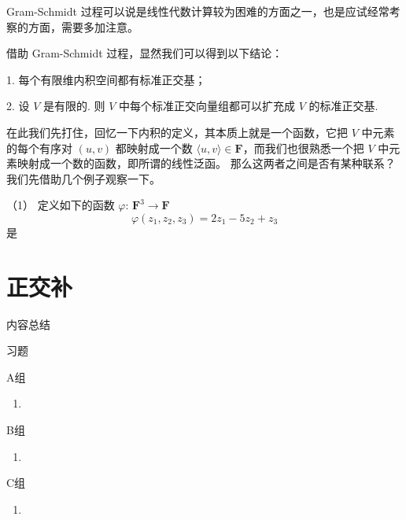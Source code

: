 Gram-Schmidt 过程可以说是线性代数计算较为困难的方面之一，也是应试经常考察的方面，需要多加注意。

借助 Gram-Schmidt 过程，显然我们可以得到以下结论：

1. 每个有限维内积空间都有标准正交基；

2. 设 $ V $ 是有限的. 则 $ V $ 中每个标准正交向量组都可以扩充成 $ V $ 的标准正交基.

\vspace{2ex}

在此我们先打住，回忆一下内积的定义，其本质上就是一个函数，它把 $ V $ 中元素的每个有序对 $(u, v)$ 都映射成一个数 
$ \langle u, v \rangle \in \mathbf{F}$，而我们也很熟悉一个把 $ V $ 中元素映射成一个数的函数，即所谓的线性泛函。
那么这两者之间是否有某种联系？我们先借助几个例子观察一下。

\begin{example}
    \textup{（1）} 定义如下的函数 $\varphi$: $\mathbf{F}^{3} \rightarrow \mathbf{F}$
    \[\varphi(z_1, z_2, z_3) = 2z_1 - 5z_2 + z_3\]
    是
\end{example}

\section{正交补}

\vspace{2ex} 
\centerline{\heiti \Large 内容总结}

\vspace{2ex} 

\centerline{\heiti \Large 习题}
\vspace{2ex} 
{\kaishu }
\begin{flushright}
    \kaishu

\end{flushright}
\centerline{\heiti A组}
\begin{enumerate}
	\item 
\end{enumerate}
\centerline{\heiti B组}
\begin{enumerate}
	\item 
\end{enumerate}
\centerline{\heiti C组}
\begin{enumerate}
	\item 
\end{enumerate}